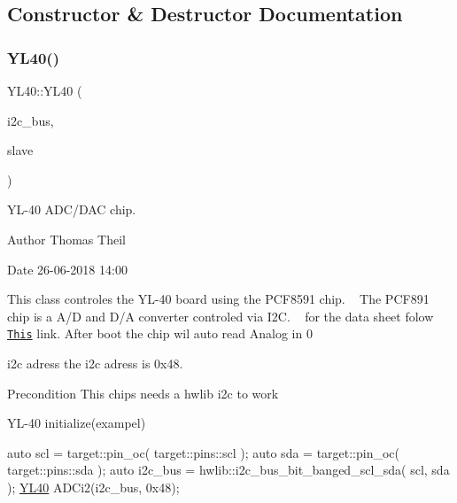 \subsection{Constructor \& Destructor Documentation}
\mbox{\label{class_y_l40_a5cbc98cfd60b1d4fd489dfa79254fd33}} 
\subsubsection{\texorpdfstring{Y\+L40()}{YL40()}}
{\footnotesize\ttfamily Y\+L40\+::\+Y\+L40 (\begin{DoxyParamCaption}\item[{hwlib\+::i2c\+\_\+bus\+\_\+bit\+\_\+banged\+\_\+scl\+\_\+sda \&}]{i2c\+\_\+bus,  }\item[{char}]{slave }\end{DoxyParamCaption})}



Y\+L-\/40 A\+D\+C/\+D\+AC chip. 

\begin{DoxyAuthor}{Author}
Thomas Theil 
\end{DoxyAuthor}
\begin{DoxyDate}{Date}
26-\/06-\/2018 14\+:00
\end{DoxyDate}
This class controles the Y\+L-\/40 board using the P\+C\+F8591 chip. ~\newline
The P\+C\+F891 chip is a A/D and D/A converter controled via I2C. ~\newline
for the data sheet folow \href{https://www.aurel32.net/elec/pcf8591.pdf}{\tt This} link. After boot the chip wil auto read Analog in 0

\begin{DoxyParagraph}{i2c adress}
the i2c adress is 0x48.
\end{DoxyParagraph}
\begin{DoxyPrecond}{Precondition}
This chips needs a hwlib i2c to work 
\end{DoxyPrecond}
Y\+L-\/40 initialize(exampel) 
\begin{DoxyCode}
\textcolor{keyword}{auto} scl     = target::pin\_oc( target::pins::scl );
\textcolor{keyword}{auto} sda      = target::pin\_oc( target::pins::sda );
\textcolor{keyword}{auto} i2c\_bus = hwlib::i2c\_bus\_bit\_banged\_scl\_sda( scl, sda );
\mbox{\hyperlink{class_y_l40}{YL40}} ADCi2(i2c\_bus, 0x48);
\end{DoxyCode}


